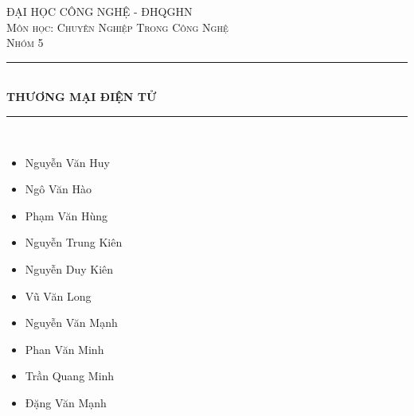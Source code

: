\begin{titlepage}

\newcommand{\HRule}{\rule{\linewidth}{0.5mm}} %

\center %
 

\textsc{\LARGE ĐẠI HỌC CÔNG NGHỆ - ĐHQGHN}\\[1.5cm]
\textsc{\Large Môn học: Chuyên Nghiệp Trong Công Nghệ}\\[0.5cm] %
\textsc{\large Nhóm 5 }\\[0.5cm] %


\HRule \\[0.4cm]
{ \huge \bfseries THƯƠNG MẠI ĐIỆN TỬ}\\[0.4cm] %
\HRule \\[1.5cm]
 

\begin{minipage}{1.2\textwidth}
\begin{multicols}{2}
\begin{itemize}
    \item Nguyễn Văn Huy
    \item Ngô Văn Hào
    \item Phạm Văn Hùng
    \item Nguyễn Trung Kiên
    \item Nguyễn Duy Kiên
    \item Vũ Văn Long
    \item Nguyễn Văn Mạnh
    \item Phan Văn Minh
    \item Trần Quang Minh
    \item Đặng Văn Mạnh
\end{itemize}
\end{multicols}
\end{minipage}\\[2cm]


\end{titlepage}
